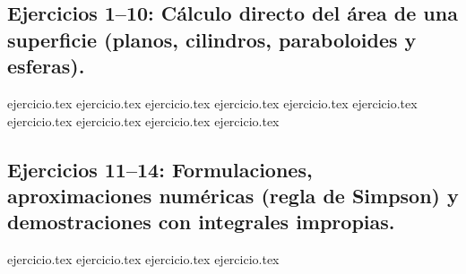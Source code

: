 
\subsection*{Ejercicios 1--10: Cálculo directo del área de una superficie (planos, cilindros, paraboloides y esferas).}
\begin{enumerate}
    {ejercicio.tex}
    {ejercicio.tex}
    {ejercicio.tex}
    {ejercicio.tex}
    {ejercicio.tex}
    {ejercicio.tex}
    {ejercicio.tex}
    {ejercicio.tex}
    {ejercicio.tex}
    {ejercicio.tex}
\end{enumerate}

\subsection*{Ejercicios 11--14: Formulaciones, aproximaciones numéricas (regla de Simpson) y demostraciones con integrales impropias.}
\begin{enumerate}
    \setcounter{enumi}{10}
    {ejercicio.tex}
    {ejercicio.tex}
    {ejercicio.tex}
    {ejercicio.tex}
\end{enumerate}
